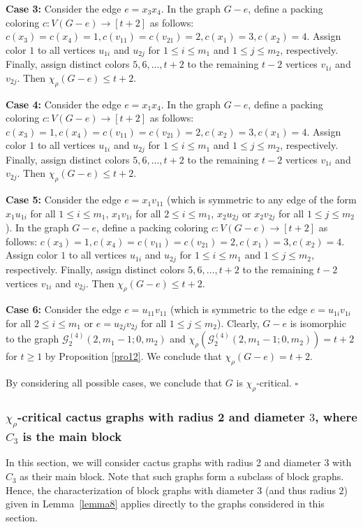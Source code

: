 \documentclass[12pt]{article}
\newcommand{\qed}{\hfill $\square$ \bigskip}
\begin{document}
\textbf{Case 3:} Consider the edge $e=x_3x_4$. In the graph \( G-e \), define a packing coloring \( c : V(G-e) \to [t+2] \) as follows:
$c(x_3)=c(x_4)= 1, 
c(v_{11})=c(v_{21})=2,
c(x_1) = 3,
c(x_2) = 4.$
Assign color \(1\) to all vertices \(u_{1i}\) and \(u_{2j}\) for \(1 \le i \le m_1\) and \(1 \le j \le m_2\), respectively. 
Finally, assign distinct colors \(5, 6, \dots, t+2\) to the remaining \(t-2\) vertices \(v_{1i}\) and \(v_{2j}\). Then \(\chi_\rho(G-e) \le t+2\).
	
\textbf{Case 4:} Consider the edge $e=x_1x_4$. In the graph \( G-e \), define a packing coloring \( c : V(G-e) \to [t+2] \) as follows:
$c(x_3)= 1, 
c(x_4)=c(v_{11})=c(v_{21})=2,
c(x_2) = 3,
c(x_1)=4.$
Assign color \(1\) to all vertices \(u_{1i}\) and \(u_{2j}\) for \(1 \le i \le m_1\) and \(1 \le j \le m_2\), respectively. 
Finally, assign distinct colors \(5, 6, \dots, t+2\) to the remaining \(t-2\) vertices \(v_{1i}\) and \(v_{2j}\). Then \(\chi_\rho(G-e) \le t+2\).
	
\textbf{Case 5:} Consider the edge $e=x_1v_{11}$ (which is symmetric to any edge of the form $x_1u_{1i}$ for all $1\le i\le m_1$, $x_1v_{1i}$ for all $2\le i\le m_1$, $x_2u_{2j}$ or $x_2v_{2j}$ for all $1\le j\le m_2$). In the graph \( G-e \), define a packing coloring \( c : V(G-e) \to [t+2] \) as follows:
$c(x_3)= 1, 
c(x_4)=c(v_{11})=c(v_{21})= 2,
c(x_1)=3,
c(x_2)=4.$
Assign color \(1\) to all vertices \(u_{1i}\) and \(u_{2j}\) for \(1 \le i \le m_1\) and \(1 \le j \le m_2\), respectively. 
Finally, assign distinct colors \(5, 6, \dots, t+2\) to the remaining \(t-2\) vertices \(v_{1i}\) and \(v_{2j}\). Then \(\chi_\rho(G-e) \le t+2\).
	
\textbf{Case 6:} Consider the edge $e=u_{11}v_{11}$ (which is symmetric to the edge $e = u_{1i}v_{1i}$ for all $2 \leq i \leq m_1$ or $e = u_{2j}v_{2j}$ for all $1 \leq j \leq m_2$).  Clearly, $G-e$ is isomorphic to the graph $\mathcal{G}_{2}^{(4)}(2,m_{1}-1;0,m_{2})$ and $\chi_{\rho}(\mathcal{G}_{2}^{(4)}(2,m_{1}-1;0,m_{2})) = t+2$ for $t\geq1$ by Proposition \ref{pro12}. We conclude that  $\chi_\rho(G-e) =  t+2$.
	
By considering all possible cases, we conclude that \( G \) is \( \chi_{\rho} \)-critical.
\qed

\subsubsection{$\chi_{\rho}$-critical cactus graphs with radius 2 and diameter $3$, where $C_3$ is the main block}
In this section, we will consider cactus graphs with radius 2 and diameter $3$ with $C_3$ as their main block. Note that such graphs form a subclass of block graphs. Hence, the characterization of block graphs with diameter $3$ (and thus radius $2$) given in Lemma~\ref{lemma8} applies directly to the graphs considered in this section.
\end{document}
